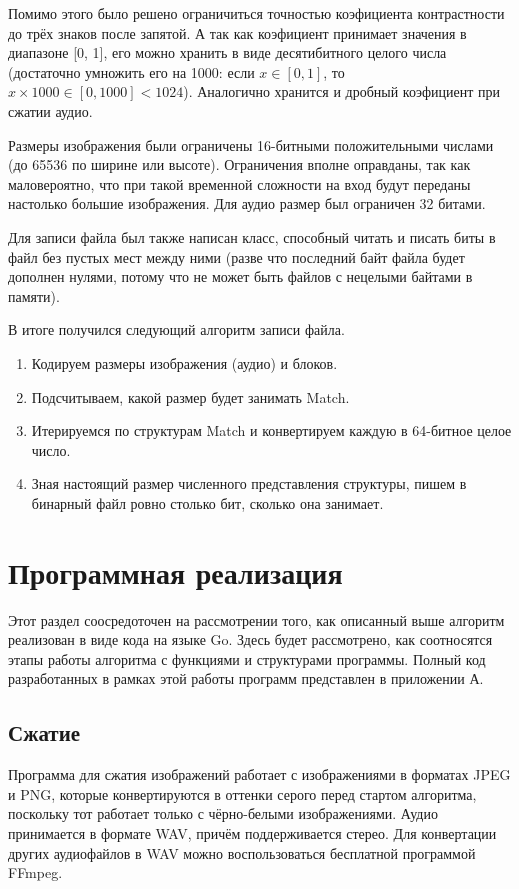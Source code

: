 \documentclass[bachelor,paper]{pmk-graduate}
\theoremstyle{definition}
\begin{document}
Помимо этого было решено ограничиться точностью коэфициента контрастности до трёх знаков после запятой. А так как коэфициент принимает значения в диапазоне [0, 1], его можно хранить в виде десятибитного целого числа (достаточно умножить его на 1000: если $x\in[0,1]$, то $x\times 1000\in[0,1000] < 1024$). Аналогично хранится и дробный коэфициент при сжатии аудио.

Размеры изображения были ограничены 16-битными положительными числами (до 65536 по ширине или высоте). Ограничения вполне оправданы, так как маловероятно, что при такой временной сложности на вход будут переданы настолько большие изображения. Для аудио размер был ограничен 32 битами.

Для записи файла был также написан класс, способный читать и писать биты в файл без пустых мест между ними (разве что последний байт файла будет дополнен нулями, потому что не может быть файлов с нецелыми байтами в памяти).

В итоге получился следующий алгоритм записи файла.
\begin{enumerate}
  \item Кодируем размеры изображения (аудио) и блоков.
  \item Подсчитываем, какой размер будет занимать Match.
  \item Итерируемся по структурам Match и конвертируем каждую в 64-битное целое число.
  \item Зная настоящий размер численного представления структуры, пишем в бинарный файл ровно столько бит, сколько она занимает.
\end{enumerate}

\section{Программная реализация}

Этот раздел соосредоточен на рассмотрении того, как описанный выше алгоритм реализован в виде кода на языке Go. Здесь будет рассмотрено, как соотносятся этапы работы алгоритма с функциями и структурами программы. Полный код разработанных в рамках этой работы программ представлен в приложении А.

\subsection{Сжатие}

Программа для сжатия изображений работает с изображениями в форматах JPEG и PNG, которые конвертируются в оттенки серого перед стартом алгоритма, поскольку тот работает только с чёрно-белыми изображениями. Аудио принимается в формате WAV, причём поддерживается стерео. Для конвертации других аудиофайлов в WAV можно воспользоваться бесплатной программой FFmpeg.
\end{document}
